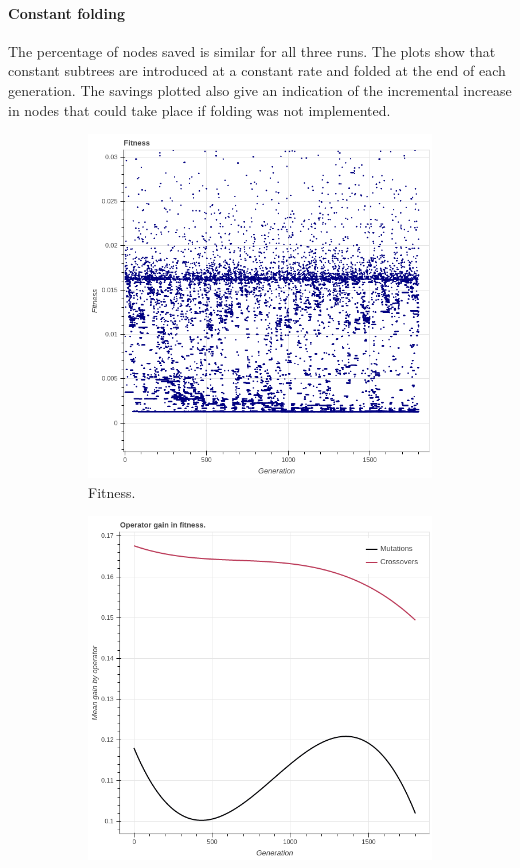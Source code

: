 \paragraph{Constant folding}
The percentage of nodes saved is similar for all three runs. The plots show that constant subtrees are introduced at a constant rate and folded at the end of each generation. The savings plotted also give an indication of the incremental increase in nodes that could take place if folding was not implemented. 
 \begin{figure}
    \begin{subfigure}{0.6\textwidth}
        \includegraphics[width=0.8\linewidth]{figures/incrementalfitness30s.png}
        \caption{Fitness.}
    \end{subfigure}
    \begin{subfigure}{0.6\textwidth}
        \includegraphics[width=0.8\linewidth]{figures/incrementaloperatorgain30s.png}

\end{subfigure}
\end{figure}
